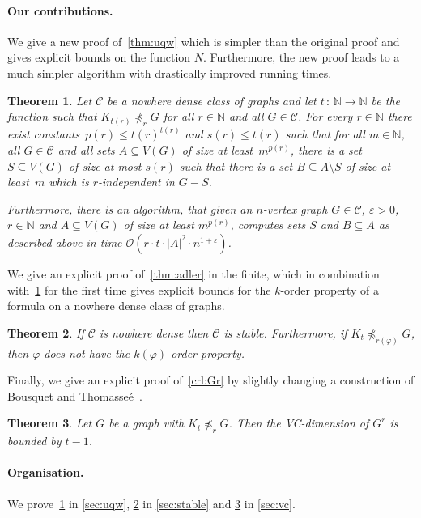 \documentclass[11pt, fleqn]{article}
\theoremstyle{plain}
\newtheorem{theorem}{Theorem}
\theoremstyle{nonumberplain}
\newcommand{\Oof}{\mathcal{O}}
\newcommand{\CCC}{\mathcal{C}}
\newcommand{\N}{\mathbb{N}}
\renewcommand{\phi}{\varphi}
\renewcommand{\epsilon}{\varepsilon}
\newcommand{\minor}{\preccurlyeq}
\begin{document}
\paragraph{Our contributions.}

We give a new proof of~\cref{thm:uqw} which is simpler than 
the original proof and gives explicit bounds on the function $N$. 
Furthermore, the new proof leads to a much simpler algorithm 
with drastically improved running times.

\begin{theorem}\label{thm:new-uqw}
  Let $\CCC$ be a nowhere dense class of graphs and let 
  $t\,\colon\,\N\rightarrow \N$ be the function such that
  $K_{t(r)}\not\minor_r G$ for all $r\in \N$ and all $G\in \CCC$.  
  For every $r\in \N$
  there exist constants~$p(r)\leq t(r)^{t(r)}$ and $s(r)\leq t(r)$ such that
  for all $m\in \N$, all $G\in\CCC$ and all sets $A\subseteq V(G)$ of size at 
  least~$m^{p(r)}$, there is a set $S\subseteq V(G)$ of size at
  most $s(r)$ such that there is a set $B\subseteq A\setminus S$ of size at
  least~$m$ which is $r$-independent in $G-S$.
  
  Furthermore, there is an algorithm, that given an $n$-vertex graph
  $G\in \CCC$, $\epsilon>0$, $r\in \N$ and $A\subseteq V(G)$ of size at least
  $m^{p(r)}$, computes sets $S$ and $B\subseteq A$ as described above
  in
  time $\Oof(r\cdot t\cdot |A|^2\cdot n^{1+\epsilon})$.
\end{theorem}

We give an explicit proof of~\cref{thm:adler} in the finite, 
which in combination with~\cref{thm:new-uqw} for the first time
gives explicit bounds for the $k$-order property of a formula
on a nowhere dense class of graphs. 

\begin{theorem}\label{thm:new-stable}
If $\CCC$ is nowhere dense then $\CCC$ is stable. Furthermore, 
if $K_t\not\minor_{r(\phi)} G$, then $\phi$ does not have
the $k(\phi)$-order property.
\end{theorem}

Finally, we give an explicit proof of~\cref{crl:Gr} by slightly
changing a construction of Bousquet and 
Thomasse\'e~\cite{BousquetT15}. 

\begin{theorem}\label{thm:new-vc}
Let $G$ be a graph with $K_t\not\minor_r G$. Then 
the VC-dimension of $G^r$ is
bounded by $t-1$. 
\end{theorem}

\paragraph{Organisation.}
We prove~\cref{thm:new-uqw} in \cref{sec:uqw}, 
\cref{thm:new-stable} in \cref{sec:stable} and
\cref{thm:new-vc} in \cref{sec:vc}. 
\end{document}
